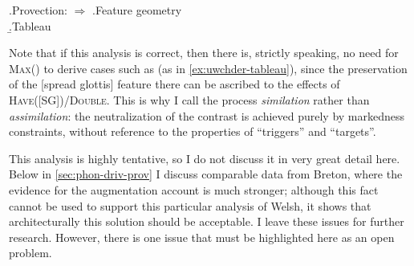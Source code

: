 \ex.\label{welsh-provection}Provection:  $\Rightarrow$ \ipa{[ˈɡwakter]}
\a.Feature geometry\\
\b.Tableau\\

Note that if this analysis is correct, then there is, strictly speaking, no need for \textsc{Max}() to derive cases such as \ipa{[iuχter]} (as in \cref{ex:uwchder-tableau}), since the preservation of the [spread glottis] feature there can be ascribed to the effects of \textsc{Have}([SG])/\textsc{Double}. This is why I call the process \emph{similation} rather than \emph{assimilation}: the neutralization of the contrast is achieved purely by markedness constraints, without reference to the properties of \enquote{triggers} and \enquote{targets}.

This analysis is highly tentative, so I do not discuss it in very great detail here. Below in \cref{sec:phon-driv-prov} I discuss comparable data from Breton, where the evidence for the augmentation account is much stronger; although this fact cannot be used to support this particular analysis of Welsh, it shows that architecturally this solution should be acceptable. I leave these issues for further research. However, there is one issue that must be highlighted here as an open problem.

